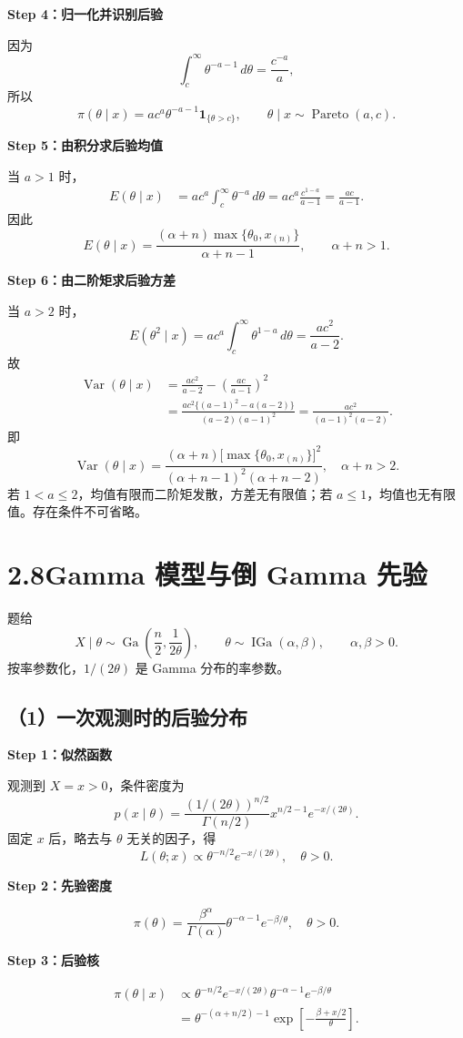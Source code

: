 \documentclass[UTF8,zihao=-4]{ctexart}
\newcommand{\step}[1]{\par\medskip\noindent\textbf{#1}\par\nopagebreak}
\newcommand{\Ga}{\operatorname{Ga}}
\newcommand{\IGa}{\operatorname{IGa}}
\newcommand{\Var}{\operatorname{Var}}
\newcommand{\ind}{\mathbf{1}}
\begin{document}
\step{Step 4：归一化并识别后验}
因为
\[
\int_c^\infty\theta^{-a-1}\,d\theta=\frac{c^{-a}}a,
\]
所以
\[
\boxed{\pi(\theta\mid x)=ac^a\theta^{-a-1}\ind_{\{\theta>c\}},
\qquad\theta\mid x\sim\operatorname{Pareto}(a,c).}
\]

\step{Step 5：由积分求后验均值}
当 $a>1$ 时，
\begin{align*}
E(\theta\mid x)
&=ac^a\int_c^\infty\theta^{-a}\,d\theta
=ac^a\frac{c^{1-a}}{a-1}
=\frac{ac}{a-1}.
\end{align*}
因此
\[
\boxed{E(\theta\mid x)=\frac{(\alpha+n)\max\{\theta_0,x_{(n)}\}}
{\alpha+n-1},\qquad\alpha+n>1.}
\]

\step{Step 6：由二阶矩求后验方差}
当 $a>2$ 时，
\[
E(\theta^2\mid x)=ac^a\int_c^\infty\theta^{1-a}\,d\theta
=\frac{ac^2}{a-2}.
\]
故
\begin{align*}
\Var(\theta\mid x)
&=\frac{ac^2}{a-2}-\left(\frac{ac}{a-1}\right)^2\\
&=\frac{ac^2\{(a-1)^2-a(a-2)\}}{(a-2)(a-1)^2}
=\frac{ac^2}{(a-1)^2(a-2)}.
\end{align*}
即
\[
\boxed{\Var(\theta\mid x)=
\frac{(\alpha+n)\bigl[\max\{\theta_0,x_{(n)}\}\bigr]^2}
{(\alpha+n-1)^2(\alpha+n-2)},\quad\alpha+n>2.}
\]
若 $1<a\leq2$，均值有限而二阶矩发散，方差无有限值；若 $a\leq1$，均值也无有限值。存在条件不可省略。
\section*{2.8\quad Gamma 模型与倒 Gamma 先验}
题给
\[
X\mid\theta\sim\Ga\left(\frac n2,\frac1{2\theta}\right),\qquad
\theta\sim\IGa(\alpha,\beta),\qquad\alpha,\beta>0.
\]
按率参数化，$1/(2\theta)$ 是 Gamma 分布的率参数。

\subsection*{（1）一次观测时的后验分布}
\step{Step 1：似然函数}
观测到 $X=x>0$，条件密度为
\[
p(x\mid\theta)=\frac{(1/(2\theta))^{n/2}}{\Gamma(n/2)}
x^{n/2-1}e^{-x/(2\theta)}.
\]
固定 $x$ 后，略去与 $\theta$ 无关的因子，得
\[
L(\theta;x)\propto\theta^{-n/2}e^{-x/(2\theta)},\quad\theta>0.
\]

\step{Step 2：先验密度}
\[
\pi(\theta)=\frac{\beta^\alpha}{\Gamma(\alpha)}
\theta^{-\alpha-1}e^{-\beta/\theta},\quad\theta>0.
\]

\step{Step 3：后验核}
\begin{align*}
\pi(\theta\mid x)
&\propto\theta^{-n/2}e^{-x/(2\theta)}
\theta^{-\alpha-1}e^{-\beta/\theta}\\
&=\theta^{-(\alpha+n/2)-1}
\exp\left[-\frac{\beta+x/2}{\theta}\right].
\end{align*}
\end{document}
